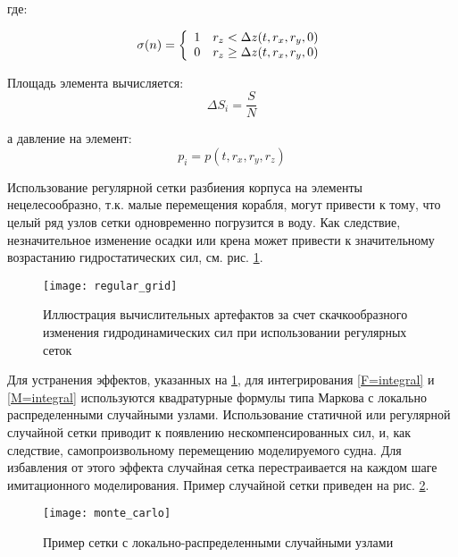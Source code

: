 где:

\begin{equation}
  \sigma(n) = \left\{
  \begin{array}{l l}
    1 & r_z		< 		\Delta z (t, r_x, r_y, 0) \\
    0 & r_z		\geq 	\Delta z (t, r_x, r_y, 0) \\
  \end{array} \right.
\end{equation}

Площадь элемента вычисляется:
\begin{equation}
	\Delta S_i = \frac{S}{N}
\end{equation}

а давление на элемент:
\begin{equation}
	p_i = p(t, r_x, r_y, r_z)
\end{equation}

Использование регулярной сетки разбиения корпуса на элементы нецелесообразно, т.к. малые перемещения корабля, могут привести к тому, что целый ряд узлов сетки одновременно погрузится в воду. Как следствие, незначительное изменение осадки или крена может привести к значительному возрастанию гидростатических сил, см. рис. \ref{regular_grid}.

\begin{figure}[ht]
\begin{center}
\texttt{[image: regular\_grid]}
\end{center}
\caption{Иллюстрация вычислительных артефактов за счет скачкообразного изменения гидродинамических сил при использовании регулярных сеток}
\label{regular_grid}
\end{figure}

Для устранения эффектов, указанных на \ref{regular_grid}, для интегрирования \eqref{F=integral} и \eqref{M=integral} используются квадратурные формулы типа Маркова с локально распределенными случайными узлами. Использование статичной или регулярной случайной сетки приводит к появлению нескомпенсированных сил, и, как следствие, самопроизвольному перемещению моделируемого судна. Для избавления от этого эффекта случайная сетка перестраивается на каждом шаге имитационного моделирования. Пример случайной сетки приведен на рис. \ref{monte_carlo}.

\begin{figure}[ht]
\begin{center}
\texttt{[image: monte\_carlo]}
\end{center}
\caption{Пример сетки с локально-распределенными случайными узлами}
\label{monte_carlo}
\end{figure}

